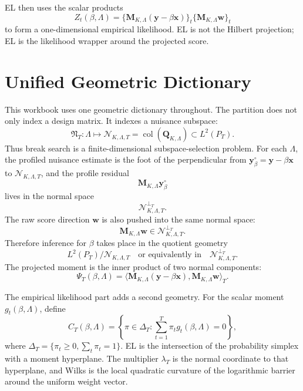 \documentclass[12pt]{article}
\numberwithin{equation}{section}
\theoremstyle{definition}
\newcommand{\N}{\mathcal N}
\newcommand{\LtwoT}{L^2(P_T)}
\newcommand{\innerT}[2]{\langle #1,#2\rangle_T}
\begin{document}
EL then uses the scalar products
\[
    Z_t(\beta,\Lambda)
    =\{\bm M_{K,\Lambda}(\bm y-\beta\bm x)\}_t\{\bm M_{K,\Lambda}\bm w\}_t
\]
to form a one-dimensional empirical likelihood. EL is not the Hilbert
projection; EL is the likelihood wrapper around the projected score.

\begin{center}
\end{center}

\section{Unified Geometric Dictionary}

This workbook uses one geometric dictionary throughout. The partition does not
only index a design matrix. It indexes a nuisance subspace:
\[
    \mathfrak N_T:\Lambda\longmapsto \N_{K,\Lambda,T}
    =\operatorname{col}(\bm Q_{K,\Lambda})\subset\LtwoT.
\]
Thus break search is a finite-dimensional subspace-selection problem. For each
\(\Lambda\), the profiled nuisance estimate is the foot of the perpendicular
from \(\bm y_\beta^\circ=\bm y-\beta\bm x\) to \(\N_{K,\Lambda,T}\), and the
profile residual
\[
    \bm M_{K,\Lambda}\bm y_\beta^\circ
\]
lives in the normal space
\[
    \N_{K,\Lambda,T}^{\perp_T}.
\]
The raw score direction \(\bm w\) is also pushed into the same normal space:
\[
    \bm M_{K,\Lambda}\bm w\in \N_{K,\Lambda,T}^{\perp_T}.
\]
Therefore inference for \(\beta\) takes place in the quotient geometry
\[
    \LtwoT/\N_{K,\Lambda,T}
    \quad\text{or equivalently in}\quad
    \N_{K,\Lambda,T}^{\perp_T}.
\]
The projected moment is the inner product of two normal components:
\[
    \Psi_T(\beta,\Lambda)
    =\innerT{\bm M_{K,\Lambda}(\bm y-\beta\bm x)}
             {\bm M_{K,\Lambda}\bm w}.
\]

The empirical likelihood part adds a second geometry. For the scalar moment
\(g_t(\beta,\Lambda)\), define
\[
    C_T(\beta,\Lambda)
    =\left\{\pi\in\Delta_T:
      \sum_{t=1}^T\pi_tg_t(\beta,\Lambda)=0\right\},
\]
where \(\Delta_T=\{\pi_t\ge0,\sum_t\pi_t=1\}\). EL is the intersection of the
probability simplex with a moment hyperplane. The multiplier \(\lambda_T\) is
the normal coordinate to that hyperplane, and Wilks is the local quadratic
curvature of the logarithmic barrier around the uniform weight vector.
\end{document}
